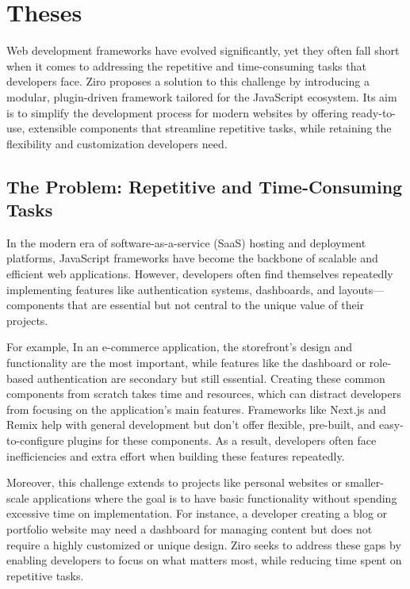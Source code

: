 \section{Theses} %

Web development frameworks have evolved significantly, yet they often fall short when it comes to addressing the repetitive and time-consuming tasks that developers face. Ziro proposes a solution to this challenge by introducing a modular, plugin-driven framework tailored for the JavaScript ecosystem. Its aim is to simplify the development process for modern websites by offering ready-to-use, extensible components that streamline repetitive tasks, while retaining the flexibility and customization developers need.

\subsection{The Problem: Repetitive and Time-Consuming Tasks}

In the modern era of software-as-a-service (SaaS) hosting and deployment platforms, JavaScript frameworks have become the backbone of scalable and efficient web applications. However, developers often find themselves repeatedly implementing features like authentication systems, dashboards, and layouts—components that are essential but not central to the unique value of their projects.

For example, In an e-commerce application, the storefront's design and functionality are the most important, while features like the dashboard or role-based authentication are secondary but still essential. Creating these common components from scratch takes time and resources, which can distract developers from focusing on the application's main features. Frameworks like Next.js and Remix help with general development but don’t offer flexible, pre-built, and easy-to-configure plugins for these components. As a result, developers often face inefficiencies and extra effort when building these features repeatedly.


Moreover, this challenge extends to projects like personal websites or smaller-scale applications where the goal is to have basic functionality without spending excessive time on implementation. For instance, a developer creating a blog or portfolio website may need a dashboard for managing content but does not require a highly customized or unique design. Ziro seeks to address these gaps by enabling developers to focus on what matters most, while reducing time spent on repetitive tasks.

